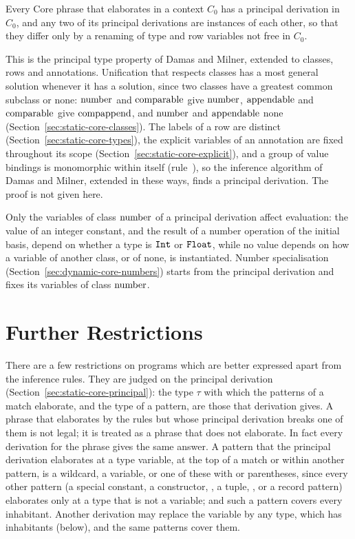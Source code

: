 \begin{property}
Every Core phrase that elaborates in a context $C_0$ has a principal derivation
in $C_0$, and any two of its principal derivations are instances of each other,
so that they differ only by a renaming of type and row variables not free in
$C_0$.
\end{property}

This is the principal type property of Damas and Milner, extended to classes,
rows and annotations. Unification that respects classes has a most general
solution whenever it has a solution, since two classes have a greatest common
subclass or none: $\mathrm{number}$ and $\mathrm{comparable}$ give $\mathrm{number}$, $\mathrm{appendable}$ and $\mathrm{comparable}$ give
$\mathrm{compappend}$, and $\mathrm{number}$ and $\mathrm{appendable}$ none (Section~\ref{sec:static-core-classes}).
The labels of a row are distinct (Section~\ref{sec:static-core-types}), the
explicit variables of an annotation are fixed throughout its scope
(Section~\ref{sec:static-core-explicit}), and a group of value bindings is
monomorphic within itself (rule~), so the inference
algorithm of Damas and Milner, extended in these ways, finds a principal
derivation. The proof is not given here. %

Only the variables of class $\mathrm{number}$ of a principal derivation affect
evaluation: the value of an integer constant, and the result of a number
operation of the initial basis, depend on whether a type is $\mathtt{Int}$ or
$\mathtt{Float}$, while no value depends on how a variable of another class, or of
none, is instantiated. Number specialisation
(Section~\ref{sec:dynamic-core-numbers}) starts from the principal derivation
and fixes its variables of class $\mathrm{number}$.

\section{Further Restrictions}\label{sec:static-core-further}

There are a few restrictions on programs which are better expressed apart from
the inference rules. They are judged on the principal derivation
(Section~\ref{sec:static-core-principal}): the type $\tau$ with which the
patterns of a match elaborate, and the type of a pattern, are those that
derivation gives. A phrase that elaborates by the rules but whose principal
derivation breaks one of them is not legal; it is treated as a phrase that does
not elaborate. In fact every derivation for the phrase gives the same answer.
A pattern that the principal derivation elaborates at a type variable, at the
top of a match or within another pattern, is a wildcard, a variable, or one of
these with  or parentheses, since every other pattern (a special
constant, a constructor, \kw{()}, a tuple, \kw{[\ ]}, \kw{::} or a record
pattern) elaborates only at a type that is not a variable; and such a pattern
covers every inhabitant. Another derivation may replace the variable by any
type, which has inhabitants (below), and the same patterns cover them. %

